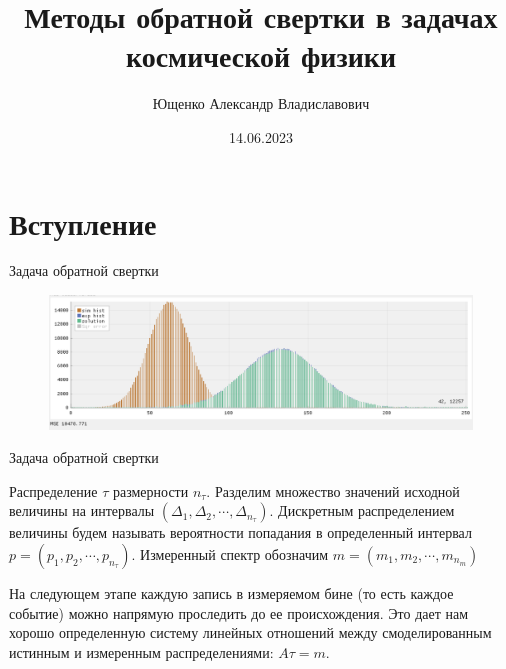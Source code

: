 \documentclass[fullscreen=true,russian,compress,%
	hyperref={unicode,bookmarks=false}]{presentation}
\begin{document}

\title[Методы обратной свертки в задачах космической физики]{Методы обратной свертки в задачах \\ космической физики}
\author{Ющенко Александр Владиславович}
\date{14.06.2023}

\begin{frame}
\titlepage
\end{frame}


\section{Вступление}


\begin{frame}{Задача обратной свертки}
   \begin{figure}[!ht]
      \includegraphics[width=\linewidth]{images/example_regulazation.png}
   \end{figure}
\end{frame}

\begin{frame}{Задача обратной свертки}
\begin{block}{}
   Распределение $\tau$ размерности $n_{\tau}$. Разделим множество значений исходной величины на интервалы 
   $(\Delta_{1}, \Delta_{2}, \cdots ,\Delta_{n_{\tau}})$. Дискретным распределением величины будем называть вероятности попадания 
   в определенный интервал $p = (p_{1}, p_{2}, \cdots, p_{n_{\tau}})$. Измеренный спектр обозначим $m = (m_{1}, m_{2}, \cdots, m_{n_{m}})$
\end{block}
\begin{block}{}
   На следующем этапе каждую запись в измеряемом бине (то есть каждое событие) можно напрямую проследить до ее происхождения. 
   Это дает нам хорошо определенную систему линейных отношений между смоделированным истинным и измеренным распределениями: 
   $A\tau = m$.
\end{block}
\end{frame}
\end{document}
